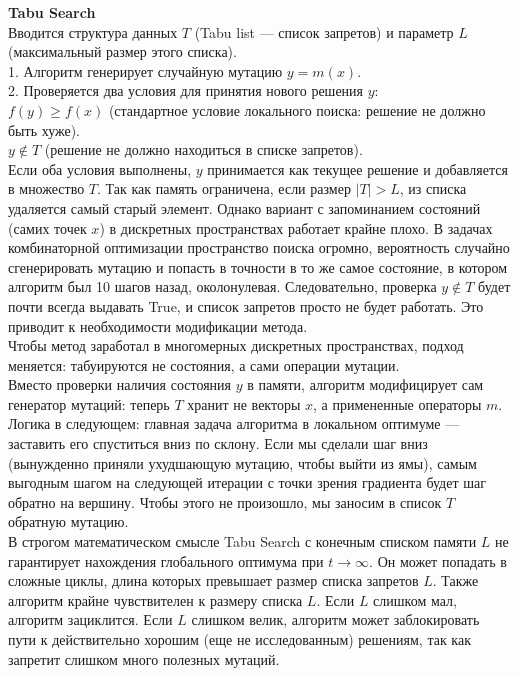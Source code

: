 \textbf{Tabu Search} \\
Вводится структура данных $T$ (Tabu list — список запретов) и параметр $L$ (максимальный размер этого списка). \\
1. Алгоритм генерирует случайную мутацию $y = m(x)$. \\
2. Проверяется два условия для принятия нового решения $y$: \\
$f(y) \ge f(x)$ (стандартное условие локального поиска: решение не должно быть хуже). \\
$y \notin T$ (решение не должно находиться в списке запретов). \\
Если оба условия выполнены, $y$ принимается как текущее решение и добавляется в множество $T$. Так как память ограничена, если размер $|T| > L$, из списка удаляется самый старый элемент.
Однако вариант с запоминанием состояний (самих точек $x$) в дискретных пространствах работает крайне плохо. В задачах комбинаторной оптимизации пространство поиска огромно, вероятность случайно сгенерировать мутацию и попасть в точности в то же самое состояние, в котором алгоритм был 10 шагов назад, околонулевая. Следовательно, проверка $y \notin T$ будет почти всегда выдавать True, и список запретов просто не будет работать. Это приводит к необходимости модификации метода. \\

Чтобы метод заработал в многомерных дискретных пространствах, подход меняется: табуируются не состояния, а сами операции мутации. \\
Вместо проверки наличия состояния $y$ в памяти, алгоритм модифицирует сам генератор мутаций: теперь $T$ хранит не векторы $x$, а примененные операторы $m$. Логика в следующем: главная задача алгоритма в локальном оптимуме — заставить его спуститься вниз по склону. Если мы сделали шаг вниз (вынужденно приняли ухудшающую мутацию, чтобы выйти из ямы), самым выгодным шагом на следующей итерации с точки зрения градиента будет шаг обратно на вершину. Чтобы этого не произошло, мы заносим в список $T$ обратную мутацию. \\
В строгом математическом смысле Tabu Search с конечным списком памяти $L$ не гарантирует нахождения глобального оптимума при $t \to \infty$. Он может попадать в сложные циклы, длина которых превышает размер списка запретов $L$.
Также алгоритм крайне чувствителен к размеру списка $L$. Если $L$ слишком мал, алгоритм зациклится. Если $L$ слишком велик, алгоритм может заблокировать пути к действительно хорошим (еще не исследованным) решениям, так как запретит слишком много полезных мутаций. \\

